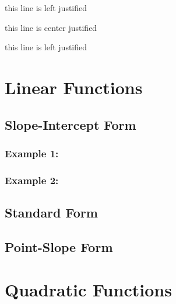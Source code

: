 \documentclass[11pt]{article}
\begin{document}
\centering
\Large
this line is left justified

this line is center justified

this line is left justified

\pagebreak

\section{Linear Functions}
	\subsection{Slope-Intercept Form}
		\subsubsection{Example 1:}
		\subsubsection{Example 2:}
	\subsection{Standard Form}
	\subsection{Point-Slope Form}
\section{Quadratic Functions}
\end{document}
